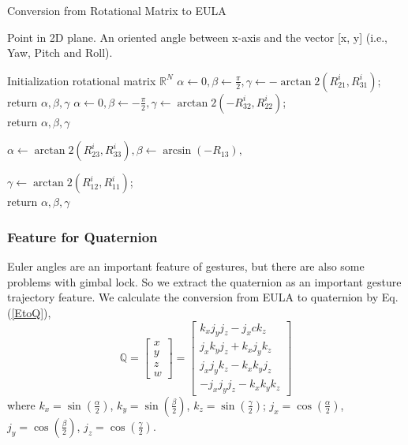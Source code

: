 \documentclass[10pt, conference, letterpaper]{IEEEtran}
\begin{document}
\begin{algorithm}
\caption{Conversion from Rotational Matrix to EULA}
\label{alg:Conversion}
\begin{algorithmic}[1]
\REQUIRE Point in 2D plane.
\ENSURE An oriented angle between x-axis and the vector [x, y] (i.e., Yaw, Pitch and Roll).

\STATE Initialization rotational matrix $\mathbb{R}^{N}$
            \STATE $\alpha \leftarrow 0, \beta \leftarrow \frac{\pi}{2}, \gamma \leftarrow -\arctan2(R_{21}^{i}, R_{31}^{i})$;\\
            return $\alpha, \beta, \gamma$
        \ENDIF
            \STATE $\alpha \leftarrow 0, \beta \leftarrow -\frac{\pi}{2}, \gamma \leftarrow \arctan2(-R_{32}^{i}, R_{22}^{i})$;\\
            return $\alpha, \beta, \gamma$

        \ELSE
            \STATE $\alpha \leftarrow \arctan2(R_{23}^{i}, R_{33}^{i}), \beta \leftarrow \arcsin(-R_{13}),$

            $\gamma \leftarrow \arctan2(R_{12}^{i}, R_{11}^{i})$;\\
            return $\alpha, \beta, \gamma$
        \ENDIF
\ENDFOR
\end{algorithmic}
\end{algorithm}

\subsubsection{Feature for Quaternion}
Euler angles are an important feature of gestures, but there are also some problems with gimbal lock. So we extract the quaternion as an important gesture trajectory feature. We calculate the conversion from EULA to quaternion by Eq. (\ref{EtoQ}),
\begin{equation}
\label{EtoQ}
\mathbb{Q} = {
\left[ \begin{array}{ccc}
x\\
y\\
z\\
w
\end{array}
\right ]}
=
{
\left[ \begin{array}{ccc}
k_{x}j_{y}j_{z}-j_{x}ck_{z}\\
j_{x}k_{y}j_{z}+k_{x}j_{y}k_{z}\\
j_{x}j_{y}k_{z}-k_{x}k_{y}j_{z}\\
-j_{x}j_{y}j_{z}-k_{x}k_{y}k_{z}
\end{array}
\right ]}
\end{equation}
where $k_{x}=\sin(\frac{\alpha}{2})$, $k_{y}=\sin(\frac{\beta}{2})$, $k_{z}=\sin(\frac{\gamma}{2})$; $j_{x}=\cos(\frac{\alpha}{2})$, $j_{y}=\cos(\frac{\beta}{2})$, $j_{z}=\cos(\frac{\gamma}{2})$.
\end{document}
